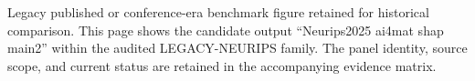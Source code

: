 Legacy published or conference-era benchmark figure retained for historical comparison. This page shows the candidate output ``Neurips2025 ai4mat shap main2'' within the audited LEGACY-NEURIPS family. The panel identity, source scope, and current status are retained in the accompanying evidence matrix.
